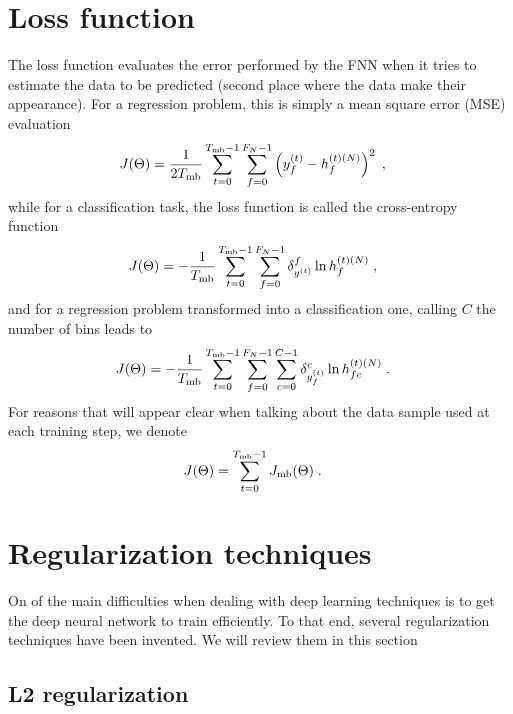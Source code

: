 \section{Loss function} \label{sec:FNNlossfunction}

The loss function evaluates the error performed by the FNN when it tries to estimate the data to be predicted (second place where the data make their appearance). For a regression problem, this is simply a mean square error (MSE) evaluation
\begin{align}
J(\Theta)&=\frac{1}{2T_{{\rm mb}}}\sum_{t=0}^{T_{{\rm mb}}-1}\sum_{f=0}^{F_N-1}
%
\left(y_f^{(t)}-h_{f}^{(t)(N)}\right)^2\;,
\end{align}
while for a classification task, the loss function is called the cross-entropy function
\begin{align}
J(\Theta)&=-\frac{1}{T_{{\rm mb}}}\sum_{t=0}^{T_{{\rm mb}}-1}\sum_{f=0}^{F_N-1}
%
\delta^f_{y^{(t)}}\ln h_{f}^{(t)(N)}\;,
\end{align}
and for a regression problem transformed into a classification one, calling $C$ the number of bins leads to 
\begin{align}
J(\Theta)&=-\frac{1}{T_{{\rm mb}}}\sum_{t=0}^{T_{{\rm mb}}-1}\sum_{f=0}^{F_N-1}\sum_{c=0}^{C-1}
%
\delta^c_{y_f^{(t)}}\ln h_{fc}^{(t)(N)}\;.
\end{align}
For reasons that will appear clear when talking about the data sample used at each training step, we denote
\begin{align}
J(\Theta)&=\sum_{t=0}^{T_{{\rm mb}}-1}J_{{\rm mb}}(\Theta)\;.
\end{align}

\section{Regularization techniques}

On of the main difficulties when dealing with deep learning techniques is to get the deep neural network to train efficiently. To that end, several regularization techniques have been invented. We will review them in this section

\subsection{L2 regularization}

